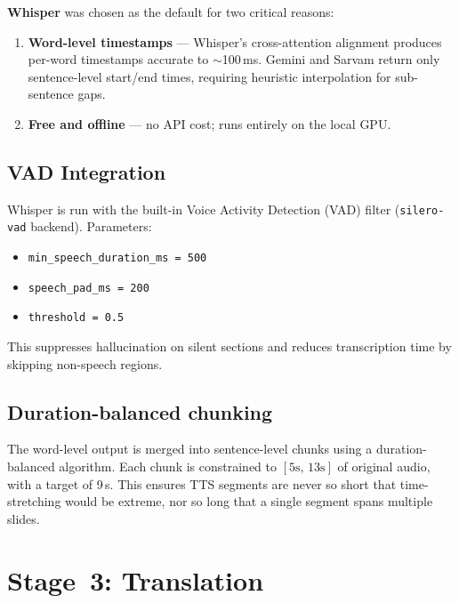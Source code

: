 \documentclass[12pt,a4paper]{article}
\begin{document}
\textbf{Whisper} was chosen as the default for two critical reasons:
\begin{enumerate}
  \item \textbf{Word-level timestamps} — Whisper's cross-attention alignment
        produces per-word timestamps accurate to $\sim$100\,ms.  Gemini and
        Sarvam return only sentence-level start/end times, requiring
        heuristic interpolation for sub-sentence gaps.
  \item \textbf{Free and offline} — no API cost; runs entirely on the local GPU.
\end{enumerate}

\subsection{VAD Integration}

Whisper is run with the built-in Voice Activity Detection (VAD) filter
(\texttt{silero-vad} backend).  Parameters:

\begin{itemize}
  \item \texttt{min\_speech\_duration\_ms = 500}
  \item \texttt{speech\_pad\_ms = 200}
  \item \texttt{threshold = 0.5}
\end{itemize}

This suppresses hallucination on silent sections and reduces transcription
time by skipping non-speech regions.

\subsection{Duration-balanced chunking}

The word-level output is merged into sentence-level chunks using a
duration-balanced algorithm.  Each chunk is constrained to
$[5\text{s},\,13\text{s}]$ of original audio, with a target of 9\,s.
This ensures TTS segments are never so short that time-stretching would
be extreme, nor so long that a single segment spans multiple slides.

\section{Stage~3: Translation}
\end{document}
